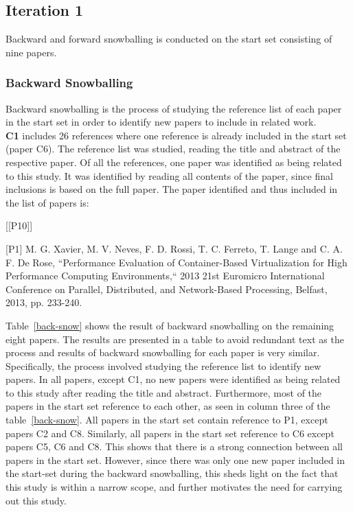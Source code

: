 \subsection{Iteration 1}
Backward and forward snowballing is conducted on the start set consisting of nine papers. 

\subsubsection{Backward Snowballing}
Backward snowballing is the process of studying the reference list of each paper in the start set in order to identify new papers to include in related work. \\

\textbf{C1} includes 26 references where one reference is already included in the start set (paper C6). The reference list was studied, reading the title and abstract of the respective paper. Of all the references, one paper was identified as being related to this study. It was identified by reading all contents of the paper, since final inclusions is based on the full paper. The paper identified and thus included in the list of papers is: \\

\begin{labeling}{[{[}P10{]}]}
\item [{[}P1{]}]  M. G. Xavier, M. V. Neves, F. D. Rossi, T. C. Ferreto, T. Lange and C. A. F. De Rose, “Performance Evaluation of Container-Based Virtualization for High Performance Computing Environments,“ 2013 21st Euromicro International Conference on Parallel, Distributed, and Network-Based Processing, Belfast, 2013, pp. 233-240.
\item
\end{labeling}

Table~\ref{back-snow} shows the result of backward snowballing on the remaining eight papers. The results are presented in a table to avoid redundant text as the process and results of backward snowballing for each paper is very similar. Specifically, the process involved studying the reference list to identify new papers. In all papers, except C1, no new papers were identified as being related to this study after reading the title and abstract. Furthermore, most of the papers in the start set reference to each other, as seen in column three of the table~\ref{back-snow}. All papers in the start set contain reference to P1, except papers C2 and C8. Similarly, all papers in the start set reference to C6 except papers C5, C6 and C8. This shows that there is a strong connection between all papers in the start set. However, since there was only one new paper included in the start-set during the backward snowballing, this sheds light on the fact that this study is within a narrow scope, and further motivates the need for carrying out this study. 

